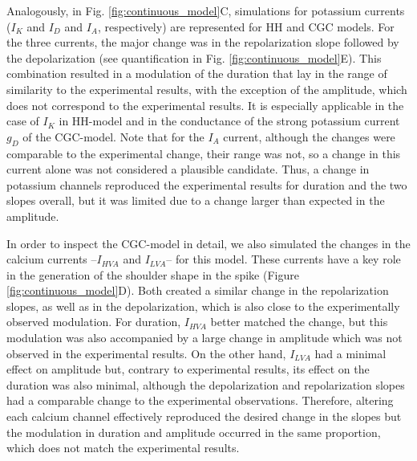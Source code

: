 Analogously, in Fig. \ref{fig:continuous_model}C, simulations for potassium currents ($I_K$ and $I_D$ and $I_A$, respectively) are represented for HH and CGC models. For the three currents, the major change was in the repolarization slope followed by the depolarization (see quantification in Fig. \ref{fig:continuous_model}E). This combination resulted in a modulation of the duration that lay in the range of similarity to the experimental results, with the exception of the amplitude, which does not correspond to the experimental results. It is especially applicable in the case of $I_K$ in HH-model and in the conductance of the strong potassium current $g_D$ of the CGC-model. Note that for the $I_A$ current, although the changes were comparable to the experimental change, their range was not, so a change in this current alone was not considered a plausible candidate. Thus, a change in potassium channels reproduced the experimental results for duration and the two slopes overall, but it was limited due to a change larger than expected in the amplitude.

In order to inspect the CGC-model in detail, we also simulated the changes in the calcium currents --$I_{HVA}$ and $I_{LVA}$-- for this model. These currents have a key role in the generation of the shoulder shape in the spike (Figure \ref{fig:continuous_model}D). Both created a similar change in the repolarization slopes, as well as in the depolarization, which is also close to the experimentally observed modulation. For duration, $I_{HVA}$ better matched the change, but this modulation was also accompanied by a large change in amplitude which was not observed in the experimental results. On the other hand, $I_{LVA}$ had a minimal effect on amplitude but, contrary to experimental results, its effect on the duration was also minimal, although the depolarization and repolarization slopes had a comparable change to the experimental observations. Therefore, altering each calcium channel effectively reproduced the desired change in the slopes but the modulation in duration and amplitude occurred in the same proportion, which does not match the experimental results.

